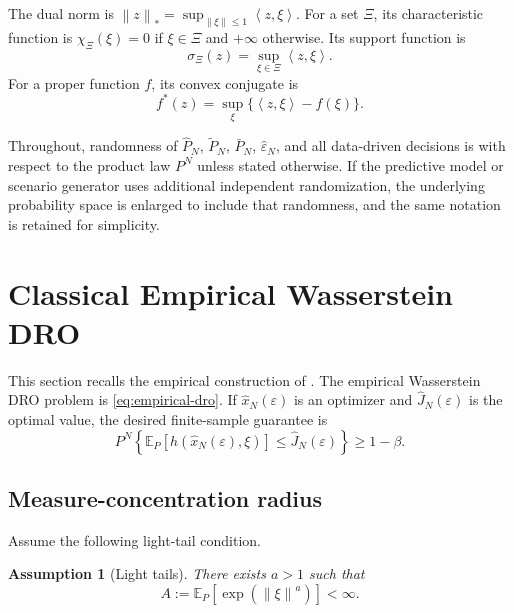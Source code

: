 \documentclass[11pt]{article}
\newtheorem{assumption}[theorem]{Assumption}
\newcommand{\E}{\mathbb{E}}
\newcommand{\XiSet}{\Xi}
\newcommand{\1}{\mathbf{1}}
\newcommand{\Phat}{\widehat P_N}
\newcommand{\Ptil}{\widetilde P_N}
\newcommand{\Pbar}{\bar P_N}
\newcommand{\epshat}{\widehat\varepsilon_N}
\newcommand{\inner}[2]{\left\langle #1,#2\right\rangle}
\newcommand{\norm}[1]{\left\lVert #1\right\rVert}
\begin{document}
The dual norm is $\norm{z}_*=\sup_{\norm{\xi}\le1}\inner{z}{\xi}$. For a set $\XiSet$, its characteristic function is $\chi_{\XiSet}(\xi)=0$ if $\xi\in\XiSet$ and $+\infty$ otherwise. Its support function is
\begin{equation}
    \sigma_{\XiSet}(z)=\sup_{\xi\in\XiSet}\inner{z}{\xi}.
\end{equation}
For a proper function $f$, its convex conjugate is
\begin{equation}
    f^*(z)=\sup_{\xi}\{\inner{z}{\xi}-f(\xi)\}.
\end{equation}

Throughout, randomness of $\Phat$, $\Ptil$, $\Pbar$, $\epshat$, and all data-driven decisions is with respect to the product law $P^N$ unless stated otherwise. If the predictive model or scenario generator uses additional independent randomization, the underlying probability space is enlarged to include that randomness, and the same notation is retained for simplicity.

\section{Classical Empirical Wasserstein DRO}

This section recalls the empirical construction of \citet{esfahani2018data}. The empirical Wasserstein DRO problem is \eqref{eq:empirical-dro}. If $\widehat x_N(\varepsilon)$ is an optimizer and $\widehat J_N(\varepsilon)$ is the optimal value, the desired finite-sample guarantee is
\begin{equation}\label{eq:desired-guarantee}
    P^N\left\{\E_P[h(\widehat x_N(\varepsilon),\xi)]\le \widehat J_N(\varepsilon)\right\}\ge 1-\beta.
\end{equation}

\subsection{Measure-concentration radius}

Assume the following light-tail condition.

\begin{assumption}[Light tails]\label{ass:light-tail}
There exists $a>1$ such that
\begin{equation}
    A:=\E_P\left[\exp(\norm{\xi}^a)\right]<\infty.
\end{equation}
\end{assumption}
\end{document}
